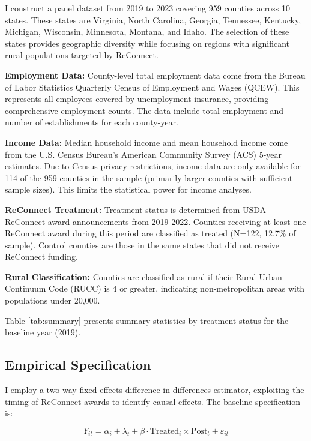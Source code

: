 \documentclass[12pt]{article}
\begin{document}
I construct a panel dataset from 2019 to 2023 covering 959 counties across 10 states. These states are Virginia, North Carolina, Georgia, Tennessee, Kentucky, Michigan, Wisconsin, Minnesota, Montana, and Idaho. The selection of these states provides geographic diversity while focusing on regions with significant rural populations targeted by ReConnect.

\textbf{Employment Data:} County-level total employment data come from the Bureau of Labor Statistics Quarterly Census of Employment and Wages (QCEW). This represents all employees covered by unemployment insurance, providing comprehensive employment counts. The data include total employment and number of establishments for each county-year.

\textbf{Income Data:} Median household income and mean household income come from the U.S. Census Bureau's American Community Survey (ACS) 5-year estimates. Due to Census privacy restrictions, income data are only available for 114 of the 959 counties in the sample (primarily larger counties with sufficient sample sizes). This limits the statistical power for income analyses.

\textbf{ReConnect Treatment:} Treatment status is determined from USDA ReConnect award announcements from 2019-2022. Counties receiving at least one ReConnect award during this period are classified as treated (N=122, 12.7\% of sample). Control counties are those in the same states that did not receive ReConnect funding.

\textbf{Rural Classification:} Counties are classified as rural if their Rural-Urban Continuum Code (RUCC) is 4 or greater, indicating non-metropolitan areas with populations under 20,000.

Table \ref{tab:summary} presents summary statistics by treatment status for the baseline year (2019).

\subsection{Empirical Specification}

I employ a two-way fixed effects difference-in-differences estimator, exploiting the timing of ReConnect awards to identify causal effects. The baseline specification is:

\begin{equation}
Y_{it} = \alpha_i + \lambda_t + \beta \cdot \text{Treated}_i \times \text{Post}_t + \varepsilon_{it}
\label{eq:did}
\end{equation}
\end{document}
